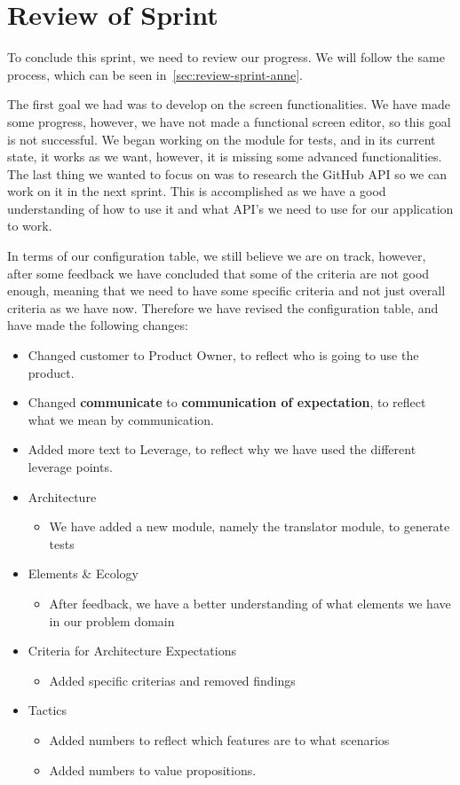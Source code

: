 \section{Review of Sprint}\label{sec:review-sprint-two}
To conclude this sprint, we need to review our progress.
We will follow the same process, which can be seen in~\autoref{sec:review-sprint-anne}.

The first goal we had was to develop on the screen functionalities.
We have made some progress, however, we have not made a functional screen editor, so this goal is not successful.
We began working on the module for tests, and in its current state, it works as we want, however, it is missing some advanced functionalities.
The last thing we wanted to focus on was to research the GitHub API so we can work on it in the next sprint.
This is accomplished as we have a good understanding of how to use it and what API's we need to use for our application to work.

In terms of our configuration table, we still believe we are on track, however, after some feedback we have concluded that some of the criteria are not good enough, meaning that we need to have some specific criteria and not just overall criteria as we have now.
Therefore we have revised the configuration table, and have made the following changes:


\begin{itemize}
    \item Changed customer to Product Owner, to reflect who is going to use the product.
    \item Changed \textbf{communicate} to \textbf{communication of expectation}, to reflect what we mean by communication.
    \item Added more text to Leverage, to reflect why we have used the different leverage points.
    \item Architecture
        \begin{itemize}
            \item We have added a new module, namely the translator module, to generate tests
        \end{itemize}
    \item Elements \& Ecology
        \begin{itemize}
            \item After feedback, we have a better understanding of what elements we have in our problem domain
        \end{itemize}
    \item Criteria for Architecture Expectations
        \begin{itemize}
            \item Added specific criterias and removed findings
        \end{itemize} 
    \item Tactics
        \begin{itemize}
            \item Added numbers to reflect which features are to what scenarios
            \item Added numbers to value propositions.
        \end{itemize} 
\end{itemize}

